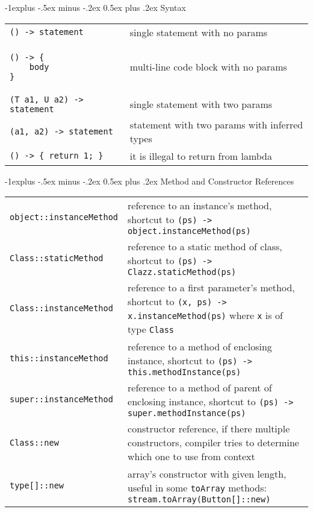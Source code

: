 \documentclass[10pt,landscape]{article}
\makeatletter
\renewcommand{\subsection}{\@startsection{subsection}{2}{0mm}%
                                {-1explus -.5ex minus -.2ex}%
                                {0.5ex plus .2ex}%
                                {\normalfont\normalsize\bfseries}}
\makeatother
\begin{document}
\begin{multicols}{2}
\subsection{Syntax}
\begin{tabular}{@{}m{\the\DefaultColLen}@{}m{\linewidth-\the\DefaultColLen}@{}}
\verb!() -> statement! & single statement with no params \\
\begin{minipage}[t]{\linewidth}
\begin{verbatim}
() -> {
    body
}
\end{verbatim}
\end{minipage} & multi-line code block with no params\\
\verb!(T a1, U a2) -> statement! & single statement with two params \\
\verb!(a1, a2) -> statement! & statement with two params with inferred types\\
\verb!() -> { return 1; }! & it is illegal to return from lambda\\
\end{tabular}

\subsection{Method and Constructor References}
\begin{tabular}{@{}m{\the\DefaultColLen}@{}m{\linewidth-\the\DefaultColLen}@{}}
\verb!object::instanceMethod! & 
	reference to an instance's method, shortcut to 
	\verb!(ps) -> object.instanceMethod(ps)! \\
\verb!Class::staticMethod! & 
	reference to a static method of class, shortcut to 
	\verb!(ps) -> Clazz.staticMethod(ps)! \\
\verb!Class::instanceMethod! & 
	reference to a first parameter's method, shortcut to 
	\verb!(x, ps) -> x.instanceMethod(ps)!  where \verb!x! is of type \verb!Class! \\
\verb!this::instanceMethod! & 
	reference to a method of enclosing instance, shortcut to
	\verb!(ps) -> this.methodInstance(ps)! \\
\verb!super::instanceMethod! & 
	reference to a method of parent of enclosing instance, shortcut to
	\verb!(ps) -> super.methodInstance(ps)! \\
\verb!Class::new! &
	constructor reference, if there multiple constructors, compiler tries to determine which one to use from context \\
\verb!type[]::new! & 
	array's constructor with given length, useful in some \verb!toArray! methods:
	\verb!stream.toArray(Button[]::new)!
\end{tabular}






\end{multicols}
\end{document}
